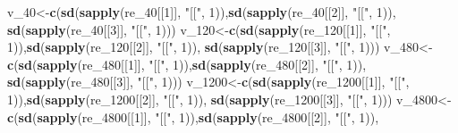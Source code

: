 \documentclass[
]{article}
\newenvironment{Shaded}{\begin{snugshade}}{\end{snugshade}}
\newcommand{\DecValTok}[1]{\textcolor[rgb]{0.00,0.00,0.81}{#1}}
\newcommand{\KeywordTok}[1]{\textcolor[rgb]{0.13,0.29,0.53}{\textbf{#1}}}
\newcommand{\NormalTok}[1]{#1}
\newcommand{\StringTok}[1]{\textcolor[rgb]{0.31,0.60,0.02}{#1}}
\begin{document}
\begin{Shaded}
\begin{Highlighting}[]
\NormalTok{v_}\DecValTok{40}\NormalTok{<-}\KeywordTok{c}\NormalTok{(}\KeywordTok{sd}\NormalTok{(}\KeywordTok{sapply}\NormalTok{(re_}\DecValTok{40}\NormalTok{[[}\DecValTok{1}\NormalTok{]], }\StringTok{"[["}\NormalTok{, }\DecValTok{1}\NormalTok{)),}\KeywordTok{sd}\NormalTok{(}\KeywordTok{sapply}\NormalTok{(re_}\DecValTok{40}\NormalTok{[[}\DecValTok{2}\NormalTok{]], }\StringTok{"[["}\NormalTok{, }\DecValTok{1}\NormalTok{)),}
        \KeywordTok{sd}\NormalTok{(}\KeywordTok{sapply}\NormalTok{(re_}\DecValTok{40}\NormalTok{[[}\DecValTok{3}\NormalTok{]], }\StringTok{"[["}\NormalTok{, }\DecValTok{1}\NormalTok{)))}
\NormalTok{v_}\DecValTok{120}\NormalTok{<-}\KeywordTok{c}\NormalTok{(}\KeywordTok{sd}\NormalTok{(}\KeywordTok{sapply}\NormalTok{(re_}\DecValTok{120}\NormalTok{[[}\DecValTok{1}\NormalTok{]], }\StringTok{"[["}\NormalTok{, }\DecValTok{1}\NormalTok{)),}\KeywordTok{sd}\NormalTok{(}\KeywordTok{sapply}\NormalTok{(re_}\DecValTok{120}\NormalTok{[[}\DecValTok{2}\NormalTok{]], }\StringTok{"[["}\NormalTok{, }\DecValTok{1}\NormalTok{)),}
        \KeywordTok{sd}\NormalTok{(}\KeywordTok{sapply}\NormalTok{(re_}\DecValTok{120}\NormalTok{[[}\DecValTok{3}\NormalTok{]], }\StringTok{"[["}\NormalTok{, }\DecValTok{1}\NormalTok{)))}
\NormalTok{v_}\DecValTok{480}\NormalTok{<-}\KeywordTok{c}\NormalTok{(}\KeywordTok{sd}\NormalTok{(}\KeywordTok{sapply}\NormalTok{(re_}\DecValTok{480}\NormalTok{[[}\DecValTok{1}\NormalTok{]], }\StringTok{"[["}\NormalTok{, }\DecValTok{1}\NormalTok{)),}\KeywordTok{sd}\NormalTok{(}\KeywordTok{sapply}\NormalTok{(re_}\DecValTok{480}\NormalTok{[[}\DecValTok{2}\NormalTok{]], }\StringTok{"[["}\NormalTok{, }\DecValTok{1}\NormalTok{)),}
        \KeywordTok{sd}\NormalTok{(}\KeywordTok{sapply}\NormalTok{(re_}\DecValTok{480}\NormalTok{[[}\DecValTok{3}\NormalTok{]], }\StringTok{"[["}\NormalTok{, }\DecValTok{1}\NormalTok{)))}
\NormalTok{v_}\DecValTok{1200}\NormalTok{<-}\KeywordTok{c}\NormalTok{(}\KeywordTok{sd}\NormalTok{(}\KeywordTok{sapply}\NormalTok{(re_}\DecValTok{1200}\NormalTok{[[}\DecValTok{1}\NormalTok{]], }\StringTok{"[["}\NormalTok{, }\DecValTok{1}\NormalTok{)),}\KeywordTok{sd}\NormalTok{(}\KeywordTok{sapply}\NormalTok{(re_}\DecValTok{1200}\NormalTok{[[}\DecValTok{2}\NormalTok{]], }\StringTok{"[["}\NormalTok{, }\DecValTok{1}\NormalTok{)),}
        \KeywordTok{sd}\NormalTok{(}\KeywordTok{sapply}\NormalTok{(re_}\DecValTok{1200}\NormalTok{[[}\DecValTok{3}\NormalTok{]], }\StringTok{"[["}\NormalTok{, }\DecValTok{1}\NormalTok{)))}
\NormalTok{v_}\DecValTok{4800}\NormalTok{<-}\KeywordTok{c}\NormalTok{(}\KeywordTok{sd}\NormalTok{(}\KeywordTok{sapply}\NormalTok{(re_}\DecValTok{4800}\NormalTok{[[}\DecValTok{1}\NormalTok{]], }\StringTok{"[["}\NormalTok{, }\DecValTok{1}\NormalTok{)),}\KeywordTok{sd}\NormalTok{(}\KeywordTok{sapply}\NormalTok{(re_}\DecValTok{4800}\NormalTok{[[}\DecValTok{2}\NormalTok{]], }\StringTok{"[["}\NormalTok{, }\DecValTok{1}\NormalTok{)),}

\end{Highlighting}
\end{Shaded}
\end{document}
